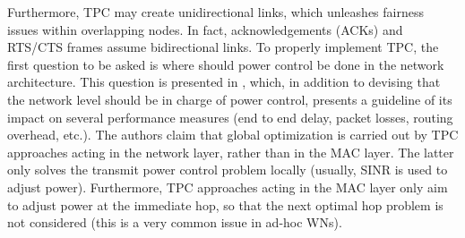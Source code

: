 \documentclass[12pt, a4paper,twoside]{tesi_upf}
\begin{document}
				Furthermore, TPC may create unidirectional links, which unleashes fairness issues within overlapping nodes. In fact, acknowledgements (ACKs) and RTS/CTS frames assume bidirectional links. To properly implement TPC, the first question to be asked is where should power control be done in the network architecture. This question is presented in \cite{kawadia2005principles}, which, in addition to devising that the network level should be in charge of power control, presents a guideline of its impact on several performance measures (end to end delay, packet losses, routing overhead, etc.). The authors claim that global optimization is carried out by TPC approaches acting in the network layer, rather than in the MAC layer. The latter only solves the transmit power control problem locally (usually, SINR is used to adjust power). Furthermore, TPC approaches acting in the MAC layer only aim to adjust power at the immediate hop, so that the next optimal hop problem is not considered (this is a very common issue in ad-hoc WNs).
				
\end{document}
